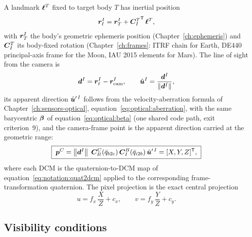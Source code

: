 A landmark $\bm{\ell}^{T}$ fixed to target body $T$ has inertial
position
\begin{equation}
  \bm{r}_{\ell}^{I} = \bm{r}_{T}^{I}
    + {\bm{C}_{I}^{T}}^{\mathsf T}\, \bm{\ell}^{T},
  \label{eq:camera:landmark}
\end{equation}
with $\bm{r}_{T}^{I}$ the body's geometric ephemeris position
(Chapter~\ref{ch:ephemeris}) and $\bm{C}_{I}^{T}$ its body-fixed rotation
(Chapter~\ref{ch:frames}: ITRF chain for Earth, DE440 principal-axis
frame for the Moon, IAU 2015 elements for Mars). The line of sight from
the camera is
\begin{equation}
  \bm{d}^{I} = \bm{r}_{\ell}^{I} - \bm{r}_{\mathrm{cam}}^{I},
  \qquad
  \hat{\bm{u}}^{I} = \frac{\bm{d}^{I}}{\left\lVert \bm{d}^{I} \right\rVert},
  \label{eq:camera:los}
\end{equation}
its apparent direction $\hat{\bm{u}}'^{\,I}$ follows from the
velocity-aberration formula of Chapter~\ref{ch:sensors-optical},
equation~\eqref{eq:optical:aberration}, with the same barycentric
$\bm{\beta}$ of equation~\eqref{eq:optical:beta} (one shared code path,
exit criterion~9), and the camera-frame point is the apparent direction
carried at the geometric range:
\begin{equation}
  \boxed{\;
  \bm{p}^{C} =
    \left\lVert \bm{d}^{I} \right\rVert\;
    \bm{C}_{B}^{C}(\bar{q}_{b2c})\,\bm{C}_{I}^{B}(\bar{q}_{i2b})\,
    \hat{\bm{u}}'^{\,I}
    = [X, Y, Z]^{\mathsf T},
  \;}
  \label{eq:camera:apparent}
\end{equation}
where each DCM is the quaternion-to-DCM map of
equation~\eqref{eq:notation:quat2dcm} applied to the corresponding
frame-transformation quaternion. The pixel projection is the exact
central projection
\begin{equation}
  \boxed{\;
  u = f_x\, \frac{X}{Z} + c_x,
  \qquad
  v = f_y\, \frac{Y}{Z} + c_y .
  \;}
  \label{eq:camera:proj}
\end{equation}

\subsection{Visibility conditions}
\label{sec:camera:visibility}

